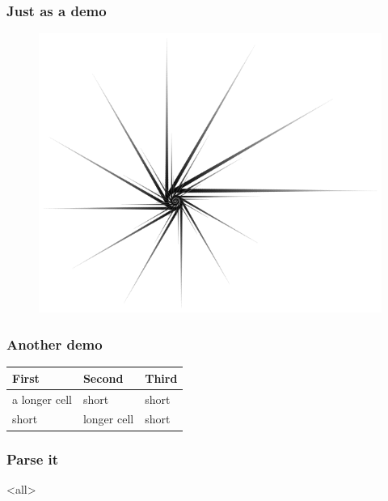 \begin{frame}

\frametitle{Just as a demo}
\label{justasademo}

\begin{figure}[htbp]
\centering
\includegraphics[keepaspectratio,width=\textwidth,height=0.75\textheight]{Nautilus_Star.png}
\label{}
\end{figure}


\end{frame}

\begin{frame}

\frametitle{Another demo}
\label{anotherdemo}

\begin{table}[htbp]
\begin{minipage}{\linewidth}
\setlength{\tymax}{0.5\linewidth}
\centering
\small
\begin{tabular}{@{}lll@{}} \toprule
First&Second&Third\\
\midrule
a longer cell&short&short\\
short&longer cell&short\\

\bottomrule

\end{tabular}
\end{minipage}
\end{table}


\end{frame}

\begin{frame}

\frametitle{Parse it}
\label{parseit}


\end{frame}

\mode<all>


\mode*

